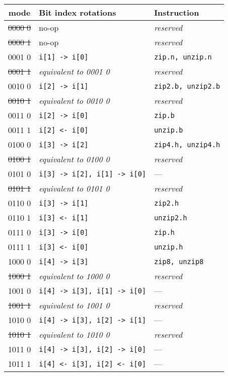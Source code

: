 \begin{table}[h]
\begin{small}
\begin{center}
\begin{tabular}{c l l}
      mode   & Bit index rotations               & Instruction \\ \hline

\sout{0000 0} & no-op                            & {\it reserved} \\
\sout{0000 1} & no-op                            & {\it reserved} \\
      0001 0  & {\tt i[1] -> i[0]}               & {\tt zip.n, unzip.n} \\
\sout{0001 1} & {\it equivalent to 0001 0}       & {\it reserved} \\
      0010 0  & {\tt i[2] -> i[1]}               & {\tt zip2.b, unzip2.b} \\
\sout{0010 1} & {\it equivalent to 0010 0}       & {\it reserved} \\
      0011 0  & {\tt i[2] -> i[0]}               & {\tt zip.b} \\
      0011 1  & {\tt i[2] <- i[0]}               & {\tt unzip.b} \\

\hline

      0100 0  & {\tt i[3] -> i[2]}               & {\tt zip4.h, unzip4.h} \\
\sout{0100 1} & {\it equivalent to 0100 0}       & {\it reserved} \\
      0101 0  & {\tt i[3] -> i[2], i[1] -> i[0]} & --- \\
\sout{0101 1} & {\it equivalent to 0101 0}       & {\it reserved} \\
      0110 0  & {\tt i[3] -> i[1]}               & {\tt zip2.h} \\
      0110 1  & {\tt i[3] <- i[1]}               & {\tt unzip2.h} \\
      0111 0  & {\tt i[3] -> i[0]}               & {\tt zip.h} \\
      0111 1  & {\tt i[3] <- i[0]}               & {\tt unzip.h} \\

\hline

      1000 0  & {\tt i[4] -> i[3]}               & {\tt zip8, unzip8} \\
\sout{1000 1} & {\it equivalent to 1000 0}       & {\it reserved} \\
      1001 0  & {\tt i[4] -> i[3], i[1] -> i[0]} & --- \\
\sout{1001 1} & {\it equivalent to 1001 0}       & {\it reserved} \\
      1010 0  & {\tt i[4] -> i[3], i[2] -> i[1]} & --- \\
\sout{1010 1} & {\it equivalent to 1010 0}       & {\it reserved} \\
      1011 0  & {\tt i[4] -> i[3], i[2] -> i[0]} & --- \\
      1011 1  & {\tt i[4] <- i[3], i[2] <- i[0]} & --- \\


\end{tabular}
\end{center}
\end{small}
\end{table}

